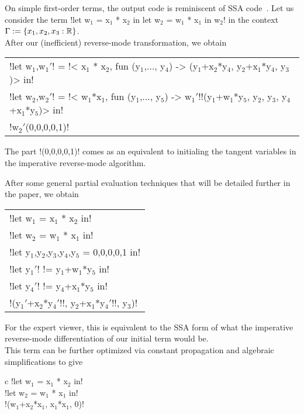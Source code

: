 \begin{example}
On simple first-order terms, the output code is reminiscent of SSA code~\cite{cytron1989efficient}.
Let us consider the term !let w$_1$ = x$_1$ * x$_2$ in let w$_2$ = w$_1$ * x$_1$ in w$_2$! in the context $\Gamma:=\{x_1,x_2, x_3:\mathbb{R}\}$.\\
After our (inefficient) reverse-mode transformation, we obtain
\begin{center}
    \begin{tabular}{l}
        !let w$_1$,w$_1'$! = !< x$_1$ * x$_2$, fun (y$_1$,$\ldots$, y$_4$) -> (y$_1$+x$_2$*y$_4$, y$_2$+x$_1$*y$_4$, y$_3$)> in!\\
        !let w$_2$,w$_2'$! = !< w$_1$*x$_1$, fun (y$_1$,$\ldots$, y$_5$) -> w$_1'$!!(y$_1$+w$_1$*y$_5$, y$_2$, y$_3$, y$_4$+x$_1$*y$_5$)> in!\\
        !w$_2'$(0,0,0,0,1)!
    \end{tabular}
\end{center}
The part !(0,0,0,0,1)! comes as an equivalent to initialing the tangent variables in the imperative reverse-mode algorithm. 

After some general partial evaluation techniques that will be detailed further in the paper, we obtain     

    \begin{center}
            \begin{tabular}{l}
                !let w$_1$ = x$_1$ * x$_2$ in!\\ 
                !let w$_2$ = w$_1$ * x$_1$ in!\\
                !let y$_1$,y$_2$,y$_3$,y$_4$,y$_5$ = 0,0,0,0,1 in!\\
                !let y$_1'$! != y$_1$+w$_1$*y$_5$ in!\\
                !let y$_4'$! != y$_4$+x$_1$*y$_5$ in!\\
                !(y$_1'$+x$_2$*y$_4'$!!, y$_2$+x$_1$*y$_4'$!!, y$_3$)!
            \end{tabular}
    \end{center}   
For the expert viewer, this is equivalent to the SSA form \cite{cytron1989efficient} of what the imperative reverse-mode differentiation of our initial term would be.\\
This term can be further optimized via constant propagation and algebraic simplifications to give
        \begin{center}
            \begin{tabular}{{c}}
                !let w$_1$ = x$_1$ * x$_2$ in!\\ 
                !let w$_2$ = w$_1$ * x$_1$ in!\\
                !(w$_1$+x$_2$*x$_1$, x$_1$*x$_1$, 0)!
            \end{tabular}
        \end{center}
    \end{example}

